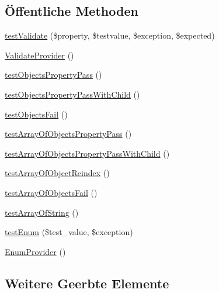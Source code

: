 \subsection*{Öffentliche Methoden}
\begin{DoxyCompactItemize}
\item 
\hyperlink{classTests_1_1Unit_1_1PropertyValidateTest_a0d03245c41f91908da1ed130477c09d6}{test\+Validate} (\$property, \$testvalue, \$exception, \$expected)
\item 
\hyperlink{classTests_1_1Unit_1_1PropertyValidateTest_acf5241cb7ddb78585d2f657cff2b451d}{Validate\+Provider} ()
\item 
\hyperlink{classTests_1_1Unit_1_1PropertyValidateTest_af1d2e2e629d485b8dc1c6ec748486320}{test\+Objects\+Property\+Pass} ()
\item 
\hyperlink{classTests_1_1Unit_1_1PropertyValidateTest_af74f8aac2ca6c2171c3e9803c4fe76bd}{test\+Objects\+Property\+Pass\+With\+Child} ()
\item 
\hyperlink{classTests_1_1Unit_1_1PropertyValidateTest_acbf65d9c7dafcd552d1bed65cba2a8cd}{test\+Objects\+Fail} ()
\item 
\hyperlink{classTests_1_1Unit_1_1PropertyValidateTest_aade9b469c31e1ea4792659bb39b292eb}{test\+Array\+Of\+Objects\+Property\+Pass} ()
\item 
\hyperlink{classTests_1_1Unit_1_1PropertyValidateTest_affb972bfecc43f9e9bad7ce8c6f626aa}{test\+Array\+Of\+Objects\+Property\+Pass\+With\+Child} ()
\item 
\hyperlink{classTests_1_1Unit_1_1PropertyValidateTest_a2fcb32261fd75c3c395e96fc8eafba96}{test\+Array\+Of\+Object\+Reindex} ()
\item 
\hyperlink{classTests_1_1Unit_1_1PropertyValidateTest_a46e8970053c031abf51f637403689749}{test\+Array\+Of\+Objects\+Fail} ()
\item 
\hyperlink{classTests_1_1Unit_1_1PropertyValidateTest_ac52f66b4f4e0e1708ff374c1fca497c1}{test\+Array\+Of\+String} ()
\item 
\hyperlink{classTests_1_1Unit_1_1PropertyValidateTest_a5919a0a3c64386e1500b2e4d91f3efc7}{test\+Enum} (\$test\+\_\+value, \$exception)
\item 
\hyperlink{classTests_1_1Unit_1_1PropertyValidateTest_af0797ae5247736737a4cabcef0f5a674}{Enum\+Provider} ()
\end{DoxyCompactItemize}
\subsection*{Weitere Geerbte Elemente}


